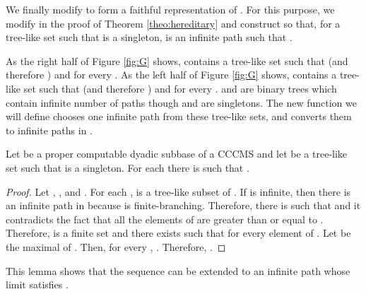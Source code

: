 \documentclass{eptcs-modified}
\begin{document}
We finally modify  to form a faithful representation  of .
For this purpose,
we modify  in the proof of Theorem \ref{theo:hereditary}
and construct 
so that, for a tree-like set  such that  is a singleton,
 is an infinite path  such that .

\begin{example}
  As the right half of Figure \ref{fig:G} shows,  contains a tree-like set  such that
 (and therefore )  and  for every .
 As the left half of Figure \ref{fig:G} shows,  contains a tree-like set  such that
 (and therefore )  and  for every .
 and  are binary trees which contain infinite number of paths
though  and  are singletons.
The new function  we will define chooses one infinite path from these tree-like sets, and converts them to infinite paths in .
\end{example}

\begin{lemma}\label{lem:sqcapsingle}
  Let  be a proper computable dyadic subbase of a CCCMS  and
  let  be a tree-like set such that  is a singleton.
  For each   there is  such that .

  \begin{proof}
    Let , ,  and .
    For each ,  is a tree-like subset of .  If  is infinite, then  there is an infinite path in  because  is finite-branching.
    Therefore, there is  such that  and it contradicts the fact that all the elements of
 are greater than or equal to  .
    Therefore,  is a finite set and there exists  such that  for every element of .   Let  be the maximal of .
    Then, for every  , .  Therefore, .
  \end{proof}
\end{lemma}

This lemma shows that the sequence  can be extended to an infinite path whose limit  satisfies .
\end{document}
